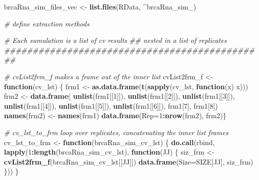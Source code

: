 \documentclass[
]{book}
\newenvironment{Shaded}{\begin{snugshade}}{\end{snugshade}}
\newcommand{\CommentTok}[1]{\textcolor[rgb]{0.56,0.35,0.01}{\textit{#1}}}
\newcommand{\ControlFlowTok}[1]{\textcolor[rgb]{0.13,0.29,0.53}{\textbf{#1}}}
\newcommand{\DataTypeTok}[1]{\textcolor[rgb]{0.13,0.29,0.53}{#1}}
\newcommand{\DecValTok}[1]{\textcolor[rgb]{0.00,0.00,0.81}{#1}}
\newcommand{\KeywordTok}[1]{\textcolor[rgb]{0.13,0.29,0.53}{\textbf{#1}}}
\newcommand{\NormalTok}[1]{#1}
\newcommand{\OperatorTok}[1]{\textcolor[rgb]{0.81,0.36,0.00}{\textbf{#1}}}
\newcommand{\StringTok}[1]{\textcolor[rgb]{0.31,0.60,0.02}{#1}}
\begin{document}
\begin{Shaded}
\begin{Highlighting}[]
\NormalTok{brcaRna\_sim\_files\_vec <{-}}\StringTok{ }\KeywordTok{list.files}\NormalTok{(}\StringTok{\textquotesingle{}RData\textquotesingle{}}\NormalTok{, }\StringTok{\textquotesingle{}\^{}brcaRna\_sim\_\textquotesingle{}}\NormalTok{)}


\CommentTok{\# define extraction methods}

\CommentTok{\# Each sumulation is a list of cv results }
\CommentTok{\#\# nested in a list of replicates}
\CommentTok{\#\#\#\#\#\#\#\#\#\#\#\#\#\#\#\#\#\#\#\#\#\#\#\#\#\#\#\#\#\#\#\#\#\#\#\#\#\#\#\#\#\#\#\#\#\#}

\CommentTok{\# cvList2frm\_f makes a frame out of the inner list}
\NormalTok{cvList2frm\_f <{-}}\StringTok{ }\ControlFlowTok{function}\NormalTok{(cv\_lst) \{}
\NormalTok{ frm1 <{-}}\StringTok{ }\KeywordTok{as.data.frame}\NormalTok{(}\KeywordTok{t}\NormalTok{(}\KeywordTok{sapply}\NormalTok{(cv\_lst, }\ControlFlowTok{function}\NormalTok{(x) x)))}
\NormalTok{ frm2 <{-}}\StringTok{ }\KeywordTok{data.frame}\NormalTok{(}
  \KeywordTok{unlist}\NormalTok{(frm1[[}\DecValTok{1}\NormalTok{]]), }\KeywordTok{unlist}\NormalTok{(frm1[[}\DecValTok{2}\NormalTok{]]),}
  \KeywordTok{unlist}\NormalTok{(frm1[[}\DecValTok{3}\NormalTok{]]), }\KeywordTok{unlist}\NormalTok{(frm1[[}\DecValTok{4}\NormalTok{]]),}
  \KeywordTok{unlist}\NormalTok{(frm1[[}\DecValTok{5}\NormalTok{]]), }\KeywordTok{unlist}\NormalTok{(frm1[[}\DecValTok{6}\NormalTok{]]),}
\NormalTok{  frm1[}\DecValTok{7}\NormalTok{], frm1[}\DecValTok{8}\NormalTok{])}
  \KeywordTok{names}\NormalTok{(frm2) <{-}}\StringTok{ }\KeywordTok{names}\NormalTok{(frm1)}
  \KeywordTok{data.frame}\NormalTok{(}\DataTypeTok{Rep=}\DecValTok{1}\OperatorTok{:}\KeywordTok{nrow}\NormalTok{(frm2), frm2)\}}

\CommentTok{\# cv\_lst\_to\_frm loop over replicates, concatenating the inner list frames}
\NormalTok{cv\_lst\_to\_frm <{-}}\StringTok{ }\ControlFlowTok{function}\NormalTok{(brcaRna\_sim\_cv\_lst) \{}
 \KeywordTok{do.call}\NormalTok{(}\StringTok{\textquotesingle{}rbind\textquotesingle{}}\NormalTok{, }\KeywordTok{lapply}\NormalTok{(}\DecValTok{1}\OperatorTok{:}\KeywordTok{length}\NormalTok{(brcaRna\_sim\_cv\_lst),}
  \ControlFlowTok{function}\NormalTok{(JJ) \{}
\NormalTok{    siz\_frm <{-}}\StringTok{ }\KeywordTok{cvList2frm\_f}\NormalTok{(brcaRna\_sim\_cv\_lst[[JJ]])}
    \KeywordTok{data.frame}\NormalTok{(}\DataTypeTok{Size=}\NormalTok{SIZE[JJ], siz\_frm)}
\NormalTok{  \}))}
\NormalTok{\}}


\end{Highlighting}
\end{Shaded}
\end{document}
